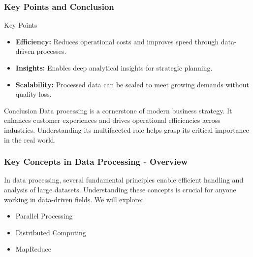 \documentclass[aspectratio=169]{beamer}
\begin{document}
\begin{frame}[fragile]
    \frametitle{Key Points and Conclusion}
    \begin{block}{Key Points}
        \begin{itemize}
            \item \textbf{Efficiency:} Reduces operational costs and improves speed through data-driven processes.
            \item \textbf{Insights:} Enables deep analytical insights for strategic planning.
            \item \textbf{Scalability:} Processed data can be scaled to meet growing demands without quality loss.
        \end{itemize}
    \end{block}

    \begin{block}{Conclusion}
        Data processing is a cornerstone of modern business strategy. It enhances customer experiences and drives operational efficiencies across industries.
        Understanding its multifaceted role helps grasp its critical importance in the real world.
    \end{block}
\end{frame}

\begin{frame}[fragile]
    \frametitle{Key Concepts in Data Processing - Overview}
    In data processing, several fundamental principles enable efficient handling and analysis of large datasets. 
    Understanding these concepts is crucial for anyone working in data-driven fields. We will explore:
    \begin{itemize}
        \item Parallel Processing
        \item Distributed Computing
        \item MapReduce
    \end{itemize}
\end{frame}
\end{document}
